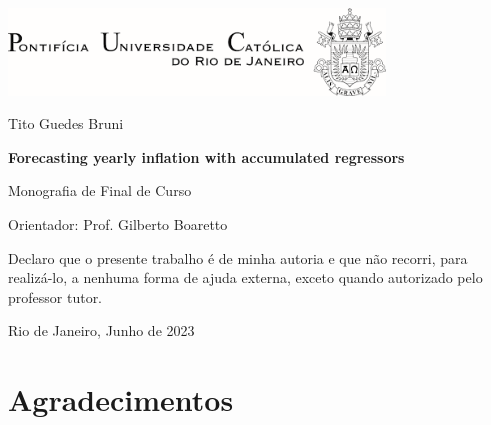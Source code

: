 \documentclass[12pt,openright,twoside,a4paper,brazil,english,emptypage,openany]{abntex2}
\begin{document}
\pretextual
{}

\setlength{\parskip}{10pt}

\pagestyle{fancy}%

\renewcommand{\chaptermark}[1]{\markboth{#1}{}}
\renewcommand{\sectionmark}[1]{\markright{#1}{}}

\fancyhf{}%
\fancyhead[RO]{\textit{\nouppercase{\newlinetospace{{\leftmark}}}}}


\flushright
\thispagestyle{empty}%
\includegraphics[width=10cm,right]{logo_puc.png}

\vspace{20pt}

\large{Tito Guedes Bruni}

\vspace{100pt}

\Large{\textbf{Forecasting yearly inflation with accumulated regressors}}

\vspace{90pt}

\normalsize
Monografia de Final de Curso

\vspace{2pt}

Orientador: Prof. Gilberto Boaretto

\vspace{40pt}

\centering

Declaro que o presente trabalho é de minha autoria e que não recorri, para realizá-lo, a nenhuma forma de ajuda externa, exceto quando autorizado pelo professor tutor.

\vspace{60pt}

Rio de Janeiro,
\wl
Junho de 2023

\flushleft
\pagebreak


\section*{Agradecimentos}
\end{document}
